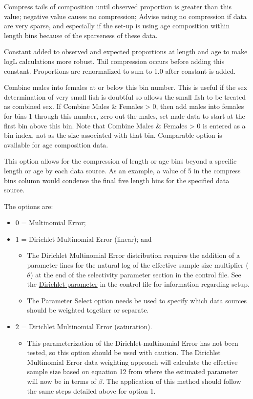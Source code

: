 
Compress tails of composition until observed proportion is greater than this value; negative value causes no compression; Advise using no compression if data are very sparse, and especially if the set-up is using age composition within length bins because of the sparseness of these data.

Constant added to observed and expected proportions at length and age to make logL calculations more robust.  Tail compression occurs before adding this constant.  Proportions are renormalized to sum to 1.0 after constant is added.

Combine males into females at or below this bin number.  This is useful if the sex determination of very small fish is doubtful so allows the small fish to be treated as combined sex.  If Combine Males \& Females > 0, then add males into females for bins 1 through this number, zero out the males, set male data to start at the first bin above this bin.  Note that Combine Males \& Females > 0 is entered as a bin index, not as the size associated with that bin.  Comparable option is available for age composition data.

This option allows for the compression of length or age bins beyond a specific length or age by each data source.  As an example,  a value of 5 in the compress bins column would condense the final five length bins for the specified data source.

The options are:
\begin{itemize}
	\item 0 = Multinomial Error;
	\item 1 = Dirichlet Multinomial Error (linear); and
	\begin{itemize}
		\item The Dirichlet Multinomial Error distribution requires the addition of a parameter lines for the natural log of the effective sample size multiplier ($\theta$) at the end of the selectivity parameter section in the control file. See the \hyperlink{Dirichletparameter}{Dirichlet parameter} in the control file for information regarding setup.
		\item The Parameter Select option needs be used to specify which data sources should be weighted together or separate. 
	\end{itemize}
	\item 2 = Dirichlet Multinomial Error (saturation).
	\begin{itemize}
		\item This parameterization of the Dirichlet-multinomial Error has not been tested, so this option should be used with caution. The Dirichlet Multinomial Error data weighting approach will calculate the effective sample size based on equation 12 from \citet{thorson-model-based-2017} where the estimated parameter will now be in terms of $\beta$. The application of this method should follow the same steps detailed above for option 1. 
	\end{itemize}
\end{itemize}

